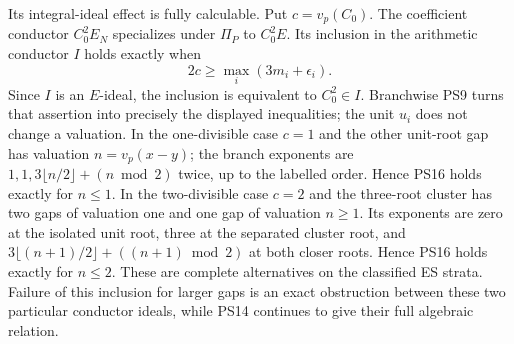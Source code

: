 \documentclass[11pt]{article}
\begin{document}
Its integral-ideal effect is fully calculable. Put $c=v_p(C_0)$.
The coefficient conductor $C_0^2 E_N$ specializes under $\Pi_P$ to
$C_0^2E$. Its inclusion in the arithmetic conductor $I$ holds exactly when
\[
 \boxed{2c\ge\max_i(3m_i+\epsilon_i).}
 \tag{PS16}
\]
Since $I$ is an $E$-ideal, the inclusion is equivalent to $C_0^2\in I$.
Branchwise PS9 turns that assertion into precisely the displayed
inequalities; the unit $u_i$ does not change a valuation.
In the one-divisible case $c=1$ and the other unit-root gap has
valuation $n=v_p(x-y)$; the branch exponents are
$1,1,3\lfloor n/2\rfloor+(n\bmod2)$ twice, up to the labelled order.
Hence PS16 holds exactly for $n\le1$.
In the two-divisible case $c=2$ and the three-root cluster has two gaps
of valuation one and one gap of valuation $n\ge1$.
Its exponents are zero at the isolated unit root, three at the separated
cluster root, and
$3\lfloor(n+1)/2\rfloor+((n+1)\bmod2)$ at both closer roots.
Hence PS16 holds exactly for $n\le2$.
These are complete alternatives on the classified ES strata.
Failure of this inclusion for larger gaps is an exact obstruction
between these two particular conductor ideals, while PS14 continues
to give their full algebraic relation.
\end{document}
